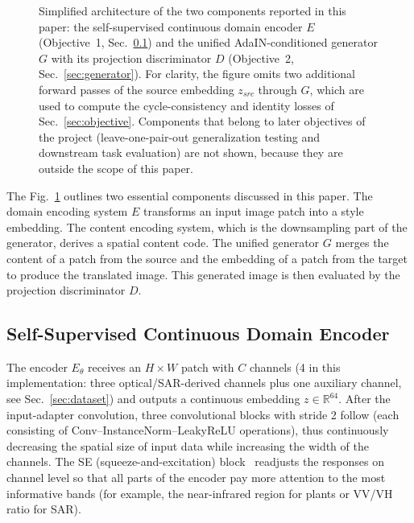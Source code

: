 \documentclass[runningheads]{llncs}
\begin{document}
\begin{figure}[t]
{}
\caption{Simplified architecture of the two components reported in this paper: the self-supervised continuous domain encoder $E$ (Objective~1, Sec.~\ref{sec:encoder}) and the unified AdaIN-conditioned generator $G$ with its projection discriminator $D$ (Objective~2, Sec.~\ref{sec:generator}). For clarity, the figure omits two additional forward passes of the source embedding $z_{src}$ through $G$, which are used to compute the cycle-consistency and identity losses of Sec.~\ref{sec:objective}. Components that belong to later objectives of the project (leave-one-pair-out generalization testing and downstream task evaluation) are not shown, because they are outside the scope of this paper.}
\label{fig:architecture}
\end{figure}

The Fig.~\ref{fig:architecture} outlines two essential components discussed in this paper. The domain encoding system $E$ transforms an input image patch into a style embedding. The content encoding system, which is the downsampling part of the generator, derives a spatial content code. The unified generator $G$ merges the content of a patch from the source and the embedding of a patch from the target to produce the translated image. This generated image is then evaluated by the projection discriminator $D$.

\subsection{Self-Supervised Continuous Domain Encoder}
\label{sec:encoder}
The encoder $E_\theta$ receives an $H \times W$ patch with $C$ channels (4 in this implementation: three optical/SAR-derived channels plus one auxiliary channel, see Sec.~\ref{sec:dataset}) and outputs a continuous embedding $z \in \mathbb{R}^{64}$. After the input-adapter convolution, three convolutional blocks with stride 2 follow (each consisting of Conv--InstanceNorm--LeakyReLU operations), thus continuously decreasing the spatial size of input data while increasing the width of the channels. The SE (squeeze-and-excitation) block~\cite{hu2018senet} readjusts the responses on channel level so that all parts of the encoder pay more attention to the most informative bands (for example, the near-infrared region for plants or VV/VH ratio for SAR).
\end{document}
